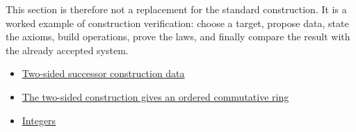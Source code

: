 \begin{remark*}[Exposition]
This section is therefore not a replacement for the standard construction. It
is a worked example of construction verification: choose a target, propose
data, state the axioms, build operations, prove the laws, and finally compare
the result with the already accepted system.
\end{remark*}

\begin{dependencies}
\begin{itemize}
  \item \hyperref[def:two-sided-successor-construction-data]{Two-sided successor construction data}
  \item \hyperref[thm:two-sided-integers-ordered-commutative-ring]{The two-sided construction gives an ordered commutative ring}
  \item \hyperref[def:integers]{Integers}
\end{itemize}
\end{dependencies}
